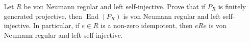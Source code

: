 Let $R$ be von Neumann regular and left self-injective. Prove that if $P_R$ is finitely generated projective, then $\operatorname{End}(P_R)$ is von Neumann regular and left self-injective. In particular, if $e \in R$ is a non-zero idempotent, then $eRe$ is von Neumann regular and left self-injective.
